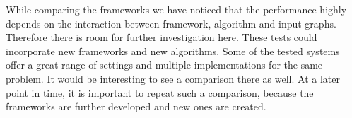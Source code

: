 While comparing the frameworks we have noticed that the performance highly depends on the interaction between framework, algorithm and input graphs.
Therefore there is room for further investigation here. These tests could incorporate new frameworks and new algorithms.
Some of the tested systems offer a great range of settings and multiple implementations for the same problem. It would be interesting to see a comparison there as well.
At a later point in time, it is important to repeat such a comparison, because the frameworks are further developed and new ones are created.
